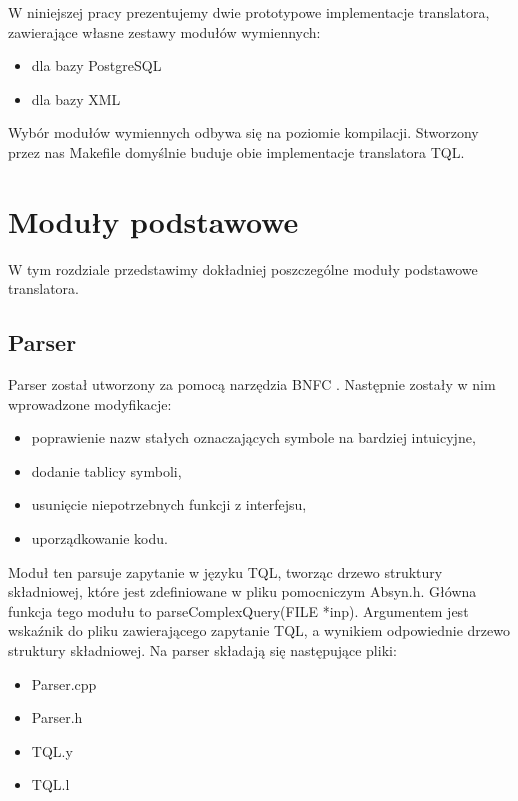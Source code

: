  W niniejszej pracy prezentujemy dwie prototypowe implementacje translatora, zawierające własne zestawy modułów wymiennych:
  \begin{itemize}
   \item dla bazy PostgreSQL
   \item dla bazy XML
  \end{itemize}
  Wybór modułów wymiennych odbywa się na poziomie kompilacji.
 Stworzony przez nas Makefile domyślnie buduje obie implementacje translatora TQL.


\chapter{Moduły podstawowe}

W tym rozdziale przedstawimy dokładniej poszczególne moduły podstawowe translatora.

\section{Parser}
Parser został utworzony za pomocą narzędzia BNFC \cite{bnfc}. Następnie zostały w nim wprowadzone modyfikacje:
\begin{itemize}
\item poprawienie nazw stałych oznaczających symbole na bardziej intuicyjne,
\item dodanie tablicy symboli,
\item usunięcie niepotrzebnych funkcji z interfejsu,
\item uporządkowanie kodu.
\end{itemize}
Moduł ten parsuje zapytanie w języku TQL, tworząc drzewo struktury składniowej, które jest zdefiniowane w pliku pomocniczym Absyn.h. Główna funkcja tego modułu to parseComplexQuery(FILE *inp). Argumentem jest wskaźnik do pliku zawierającego zapytanie TQL, a wynikiem odpowiednie drzewo struktury składniowej.
Na parser składają się następujące pliki:
\begin{itemize}
 \item Parser.cpp
 \item Parser.h
 \item TQL.y %
 \item TQL.l %
\end{itemize}

